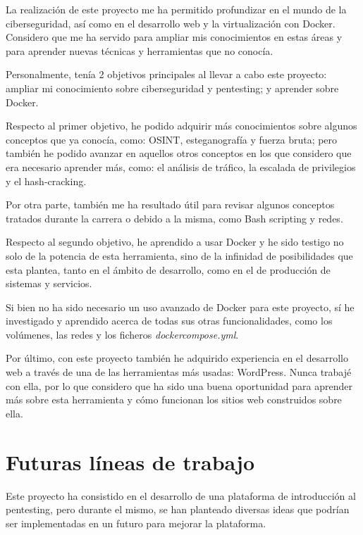         La realización de este proyecto me ha permitido profundizar en el mundo de la ciberseguridad, así como en el desarrollo web y la virtualización con Docker. Considero que me ha servido para ampliar mis conocimientos en estas áreas y para aprender nuevas técnicas y herramientas que no conocía.
    
        Personalmente, tenía 2 objetivos principales al llevar a cabo este proyecto: ampliar mi conocimiento sobre ciberseguridad y pentesting; y aprender sobre Docker.

        Respecto al primer objetivo, he podido adquirir más conocimientos sobre algunos conceptos que ya conocía, como: OSINT, esteganografía y fuerza bruta; pero también he podido avanzar en aquellos otros conceptos en los que considero que era necesario aprender más, como: el análisis de tráfico, la escalada de privilegios y el hash-cracking.
        
        Por otra parte, también me ha resultado útil para revisar algunos conceptos tratados durante la carrera o debido a la misma, como Bash scripting y redes.

        Respecto al segundo objetivo, he aprendido a usar Docker y he sido testigo no solo de la potencia de esta herramienta, sino de la infinidad de posibilidades que esta plantea, tanto en el ámbito de desarrollo, como en el de producción de sistemas y servicios.

        Si bien no ha sido necesario un uso avanzado de Docker para este proyecto, sí he investigado y aprendido acerca de todas sus otras funcionalidades, como los volúmenes, las redes y los ficheros \textit{dockercompose.yml}.

        Por último, con este proyecto también he adquirido experiencia en el desarrollo web a través de una de las herramientas más usadas: WordPress. Nunca trabajé con ella, por lo que considero que ha sido una buena oportunidad para aprender más sobre esta herramienta y cómo funcionan los sitios web construidos sobre ella.

    
    \section{Futuras líneas de trabajo}
        \label{sec:futuras-lineas-trabajo}

        Este proyecto ha consistido en el desarrollo de una plataforma de introducción al pentesting, pero durante el mismo, se han planteado diversas ideas que podrían ser implementadas en un futuro para mejorar la plataforma.

